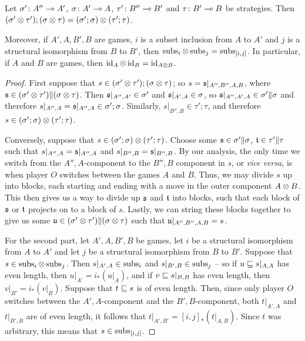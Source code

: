 \begin{proposition}
  Let $\sigma'\colon A'' \multimap A'$, $\sigma\colon A' \multimap A$, $\tau'\colon B'' \multimap B'$ and $\tau \colon B' \multimap B$ be strategies.  
  Then $(\sigma'\otimes\tau');(\sigma\otimes\tau)=(\sigma';\sigma)\otimes(\tau';\tau)$.

  Moreover, if $A',A,B',B$ are games, $i$ is a subset inclusion from $A$ to $A'$ and $j$ is a structural isomorphism from $B$ to $B'$, then $\operatorname{subs}_i\otimes\operatorname{subs}_j = \operatorname{subs}_{[i,j]}$.
  In particular, if $A$ and $B$ are games, then $\operatorname{id}_A\otimes \operatorname{id}_B=\operatorname{id}_{A\otimes B}$.
  \label{PropTensorProductIsFunctor}
\end{proposition}
\begin{proof}
  First suppose that $s\in(\sigma'\otimes\tau');(\sigma\otimes\tau)$; so $s=\mathfrak s\vert_{A'',B'',A,B}$, where $\mathfrak s\in(\sigma'\otimes\tau')\|(\sigma\otimes\tau)$.  
  Then $\mathfrak s\vert_{A'',A'}\in\sigma'$ and $\mathfrak s\vert_{A',A}\in\sigma$, so $\mathfrak s\vert_{A'',A',A}\in\sigma'\|\sigma$ and therefore $s\vert_{A'',A}=\mathfrak s\vert_{A'',A}\in\sigma';\sigma$.  
  Similarly, $s\vert_{B'',B}\in\tau';\tau$, and therefore $s\in(\sigma';\sigma)\otimes(\tau';\tau)$.

  Conversely, suppose that $s\in(\sigma';\sigma)\otimes (\tau';\tau)$.  
  Choose some $\mathfrak s\in\sigma'\|\sigma$, $\mathfrak t\in\tau'\|\tau$ such that $s\vert_{A'',A}=\mathfrak s\vert_{A'',A}$ and $s\vert_{B'',B}=\mathfrak s\vert_{B'',B}$.  
  By our analysis, the only time we switch from the $A'',A$-component to the $B'',B$ component in $s$, or \emph{vice versa}, is when player $O$ switches between the games $A$ and $B$.  
  Thus, we may divide $s$ up into blocks, each starting and ending with a move in the outer component $A \otimes B$.  
  This then gives us a way to divide up $\mathfrak s$ and $\mathfrak t$ into blocks, such that each block of $\mathfrak s$ or $\mathfrak t$ projects on to a block of $s$.  
  Lastly, we can string these blocks together to give us some $\mathfrak u\in(\sigma'\otimes\tau')\|(\sigma\otimes\tau)$ such that $\mathfrak u\vert_{A'',B'',A,B}=s$.

  For the second part, let $A',A,B',B$ be games, let $i$ be a structural isomorphism from $A$ to $A'$ and let $j$ be a structural isomorphism from $B$ to $B'$.  
  Suppose that $s\in\operatorname{subs}_i\otimes \operatorname{subs}_j$.  
  Then $s\vert_{A',A}\in\operatorname{subs}_i$ and $s\vert_{B',B}\in\operatorname{subs}_j$ -- so if $u\sqsubseteq s\vert_{A,A}$ has even length, then $u\vert_{A'}=i_*(u\vert_A)$, and if $v\sqsubseteq s\vert_{B,B}$ has even length, then $v\vert_{B'}=i_*(v\vert_B)$.  
  Suppose that $t\sqsubseteq s$ is of even length.  
  Then, since only player $O$ switches between the $A',A$-component and the $B',B$-component, both $t\vert_{A',A}$ and $t\vert_{B',B}$ are of even length, it follows that $t\vert_{A',B'}=[i,j]_*(t\vert_{A,B})$.  
  Since $t$ was arbitrary, this means that $s\in \operatorname{subs}_{[i,j]}$.


\end{proof}
